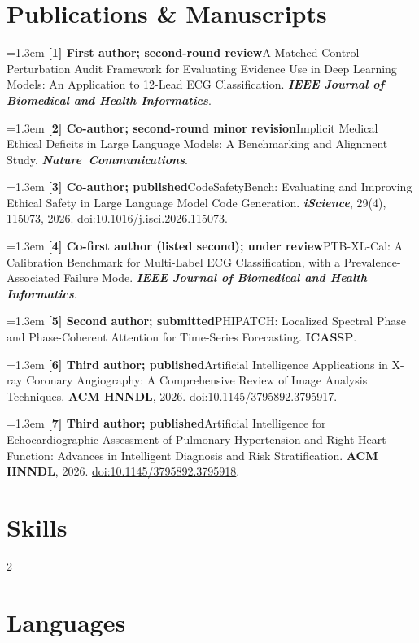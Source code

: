 \documentclass[10pt,a4paper,sans]{moderncv}
\newcommand{\pub}[2]{\noindent\hangindent=1.3em\hangafter=1 \textbf{#1}\quad #2\par\vspace{0.35em}}
\begin{document}
\section{Publications \& Manuscripts}
\pub{[1] First author; second-round review}{A Matched-Control Perturbation Audit Framework for Evaluating Evidence Use in Deep Learning Models: An Application to 12-Lead ECG Classification. \textbf{\textit{IEEE Journal of Biomedical and Health Informatics}}.}
\pub{[2] Co-author; second-round minor revision}{Implicit Medical Ethical Deficits in Large Language Models: A Benchmarking and Alignment Study. \mbox{\textbf{\textit{Nature Communications}}}.}
\pub{[3] Co-author; published}{CodeSafetyBench: Evaluating and Improving Ethical Safety in Large Language Model Code Generation. \textbf{\textit{iScience}}, 29(4), 115073, 2026. \href{https://doi.org/10.1016/j.isci.2026.115073}{doi:10.1016/j.isci.2026.115073}.}
\pub{[4] Co-first author (listed second); under review}{PTB-XL-Cal: A Calibration Benchmark for Multi-Label ECG Classification, with a Prevalence-Associated Failure Mode. \textbf{\textit{IEEE Journal of Biomedical and Health Informatics}}.}
\pub{[5] Second author; submitted}{PHIPATCH: Localized Spectral Phase and Phase-Coherent Attention for Time-Series Forecasting. \textbf{ICASSP}.}
\pub{[6] Third author; published}{Artificial Intelligence Applications in X-ray Coronary Angiography: A Comprehensive Review of Image Analysis Techniques. \textbf{ACM HNNDL}, 2026. \href{https://doi.org/10.1145/3795892.3795917}{doi:10.1145/3795892.3795917}.}
\pub{[7] Third author; published}{Artificial Intelligence for Echocardiographic Assessment of Pulmonary Hypertension and Right Heart Function: Advances in Intelligent Diagnosis and Risk Stratification. \textbf{ACM HNNDL}, 2026. \href{https://doi.org/10.1145/3795892.3795918}{doi:10.1145/3795892.3795918}.}

\section{Skills}
\begin{multicols}{2}
\columnbreak
{}
\end{multicols}
\vspace{-0.8em}

\section{Languages}
\end{document}
